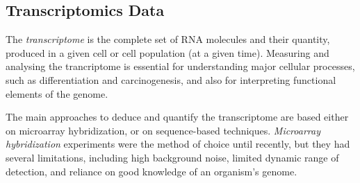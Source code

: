 \subsection{Transcriptomics Data} \label{rnaSeq-data-sect}
The \emph{transcriptome} is the complete set of RNA molecules and their quantity, produced in a given cell or cell population (at a given time). Measuring and analysing the trancriptome is essential for understanding major cellular processes, such as differentiation and carcinogenesis, and also for interpreting functional elements of the genome. 

The main approaches to deduce and quantify the transcriptome are based either on microarray hybridization, or on sequence-based techniques. \emph{Microarray hybridization} experiments \citep{Babu2004} were the method of choice until recently, but they had several limitations, including high background noise, limited dynamic range of detection, and reliance on good knowledge of an organism's genome. 

